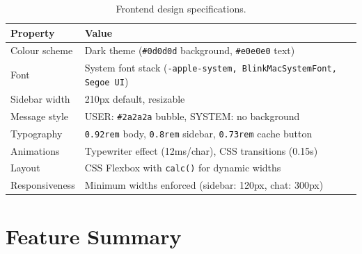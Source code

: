 \documentclass[12pt, a4paper]{article}
\begin{document}
\begin{table}[H]
\centering
\caption{Frontend design specifications.}
\begin{tabularx}{\textwidth}{l X}
\toprule
\textbf{Property} & \textbf{Value} \\
\midrule
Colour scheme   & Dark theme (\texttt{\#0d0d0d} background, \texttt{\#e0e0e0} text) \\
Font            & System font stack (\texttt{-apple-system, BlinkMacSystemFont, Segoe UI}) \\
Sidebar width   & 210px default, resizable \\
Message style   & USER: \texttt{\#2a2a2a} bubble, SYSTEM: no background \\
Typography      & \texttt{0.92rem} body, \texttt{0.8rem} sidebar, \texttt{0.73rem} cache button \\
Animations      & Typewriter effect (12ms/char), CSS transitions (0.15s) \\
Layout          & CSS Flexbox with \texttt{calc()} for dynamic widths \\
Responsiveness  & Minimum widths enforced (sidebar: 120px, chat: 300px) \\
\bottomrule
\end{tabularx}
\end{table}

\section{Feature Summary}
\end{document}
